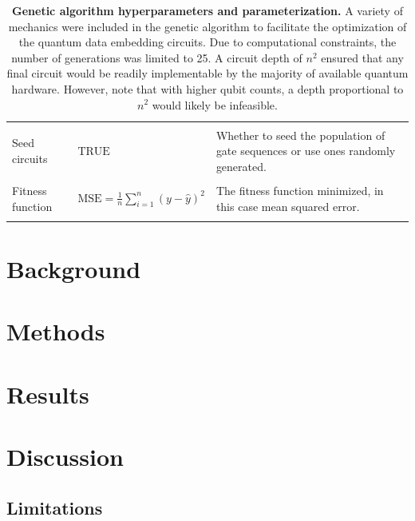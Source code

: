 \documentclass[twocolumn]{article}
\begin{document}
\begin{table}[!ht]
\begin{tabularx}{\textwidth}{
        >{\raggedright\arraybackslash}p{}
        >{\raggedright\arraybackslash}p{}
        >{\raggedright\arraybackslash}p{}
    }
        \vspace{0pt} \\
        Seed circuits & $\text{TRUE}$ & Whether to seed the population of gate sequences or use ones randomly generated.\\
        \vspace{0pt} \\
        Fitness function & $\text{MSE}=\frac{1}{n}\sum_{i=1}^n(y-\hat{y})^2$ & The fitness function minimized, in this case mean squared error.\\
        \vspace{0pt} \\
        \bottomrule
    \end{tabularx}
    \vspace{12pt}
    \caption[Genetic algorithm hyperparameters and parameterization]{\textbf{Genetic algorithm hyperparameters and parameterization.} A variety of mechanics were included in the genetic algorithm to facilitate the optimization of the quantum data embedding circuits. Due to computational constraints, the number of generations was limited to 25. A circuit depth of $n^2$ ensured that any final circuit would be readily implementable by the majority of available quantum hardware. However, note that with higher qubit counts, a depth proportional to $n^2$ would likely be infeasible.}
    \label{table:genetic-algorithm-hyperparameters}
\end{table}

\section{Background}

\section{Methods}

\section{Results}

\section{Discussion}

\subsection{Limitations}
\end{document}
